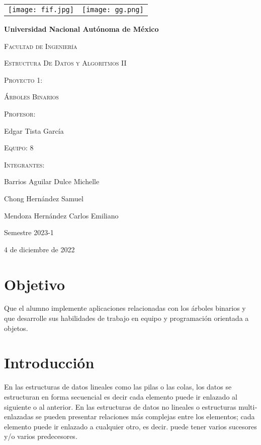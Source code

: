 \documentclass{article}
\begin{document}
\thispagestyle{empty}
\begin{titlepage}
\centering
\begin{center}
\begin{tabular}{c c}
\texttt{[image: fif.jpg]}\hspace{5cm}&\hspace{6cm}\texttt{[image: gg.png]}\\
\end{tabular}
\end{center}

{\bfseries\LARGE Universidad Nacional Autónoma de México \par}
\vspace{1cm}
{\scshape\Large Facultad de Ingeniería \par}
{\scshape\Large Estructura De Datos y Algoritmos II \par}
\vspace{2cm}
{\scshape\Large Proyecto 1: \par}
{\scshape\Large Árboles Binarios \par}
\vfill
{\scshape\Large Profesor: \par}
{\Large Edgar Tista García \par}
\vfill
{\scshape\Large Equipo: 8 \par}
\vfill
{\scshape\Large Integrantes: \par}
{\Large Barrios Aguilar Dulce Michelle \par}
{\Large Chong Hernández Samuel \par}
{\Large Mendoza Hernández Carlos Emiliano \par}
\vfill
{\Large Semestre 2023-1\par}
\vfill
{\Large 4 de diciembre de 2022 \par}
\end{titlepage}
\newpage
\section{Objetivo}
Que el alumno implemente aplicaciones relacionadas con los árboles binarios y que desarrolle sus habilidades de trabajo en equipo y programación orientada a objetos.\\
\section{Introducción}
En las estructuras de datos lineales como las pilas o las colas, los datos se estructuran en  forma secuencial es decir  cada  elemento  puede  ir  enlazado  al  siguiente  o  al  anterior.  En  las  estructuras  de  datos  no  lineales  o estructuras multi‐enlazadas se pueden presentar relaciones más complejas entre los elementos; cada elemento puede ir enlazado a cualquier otro, es decir. puede tener varios sucesores y/o varios predecesores.\\
\end{document}
